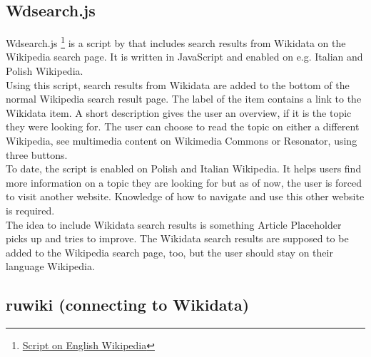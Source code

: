 \subsection{Wdsearch.js}
Wdsearch.js \footnote{\href{https://en.wikipedia.org/w/index.php?title=MediaWiki:Wdsearch.js&action=raw&ctype=text/javascript}{Script on English Wikipedia}} is a script by  that includes search results from Wikidata on the Wikipedia search page. It is written in JavaScript and enabled on e.g. Italian and Polish Wikipedia. \\
Using this script, search results from Wikidata are added to the bottom of the normal Wikipedia search result page. The label of the item  contains a link to the Wikidata item. A short description gives the user an overview, if it is the topic they were looking for. The user can choose to read the topic on either a different Wikipedia, see multimedia content on Wikimedia Commons or Resonator, using three buttons. \\
To date, the script is enabled on Polish and Italian Wikipedia. It helps users find more information on a topic they are looking for but as of now, the user is forced to visit another website. Knowledge of how to navigate and use this other website is required. \\
The idea to include Wikidata search results is something Article Placeholder picks up and tries to improve. The Wikidata search results are supposed to be added to the Wikipedia search page, too, but the user should stay on their language Wikipedia.

\subsection{ruwiki (connecting to Wikidata)}